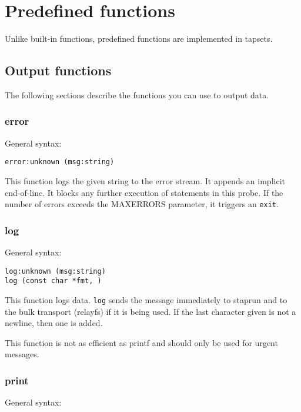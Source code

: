 \documentclass[twoside,english]{article}
\newenvironment{vindent}
{\begin{list}{}{\setlength{\listparindent}{6pt}}
\item[]}
{\end{list}}
\begin{document}
\section{Predefined functions\label{sec:Predefined-Functions}}

Unlike built-in functions, predefined functions are implemented in tapsets.


\subsection{Output functions}

The following sections describe the functions you can use to output data.


\subsubsection{error}
General syntax:

\begin{vindent}
\begin{verbatim}
error:unknown (msg:string)
\end{verbatim}
\end{vindent}
This function logs the given string to the error stream. It appends an implicit
end-of-line. It blocks any further execution of statements in this probe.
If the number of errors exceeds the MAXERRORS parameter, it triggers an \texttt{exit}.


\subsubsection{log}
General syntax:

\begin{vindent}
\begin{verbatim}
log:unknown (msg:string)
log (const char *fmt, )
\end{verbatim}
\end{vindent}
This function logs data. \texttt{log} sends the message immediately to staprun
and to the bulk transport (relayfs) if it is being used. If the last character
given is not a newline, then one is added.

This function is not as efficient as printf and should only be used for urgent
messages.

\subsubsection{print}
General syntax:
\end{document}
